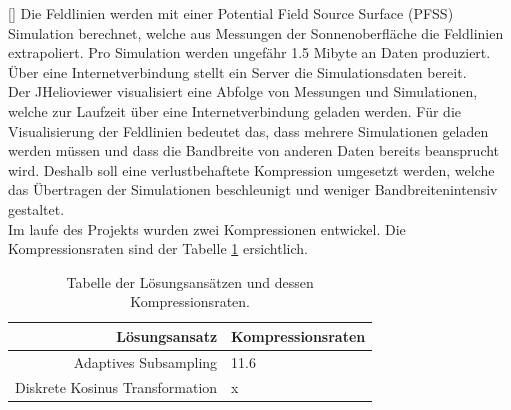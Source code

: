 [\baselineskip]
Die Feldlinien werden mit einer Potential Field Source Surface (PFSS) Simulation berechnet, welche aus Messungen der Sonnenoberfläche die Feldlinien extrapoliert. Pro Simulation werden ungefähr 1.5 Mibyte an Daten produziert. Über eine Internetverbindung stellt ein Server die Simulationsdaten bereit.\\
Der JHelioviewer visualisiert eine Abfolge von Messungen und Simulationen, welche zur Laufzeit über eine Internetverbindung geladen werden. Für die Visualisierung der Feldlinien bedeutet das, dass mehrere Simulationen geladen werden müssen und dass die Bandbreite von anderen Daten bereits beansprucht wird. Deshalb soll eine verlustbehaftete Kompression umgesetzt werden, welche das Übertragen der Simulationen beschleunigt und weniger Bandbreitenintensiv gestaltet.\\
[\baselineskip]
Im laufe des Projekts wurden zwei Kompressionen entwickel. Die Kompressionsraten sind der Tabelle \ref{einleitung:tabelle} ersichtlich.
\begin{table}[!htbp]
	\center
	\begin{tabular}{r|l}
		Lösungsansatz & Kompressionsraten \\\hline
		Adaptives Subsampling & 11.6 \\
		Diskrete Kosinus Transformation & x \\
	\end{tabular}
	\caption{Tabelle der Lösungsansätzen und dessen Kompressionsraten.}
	\label{einleitung:tabelle}
\end{table}

